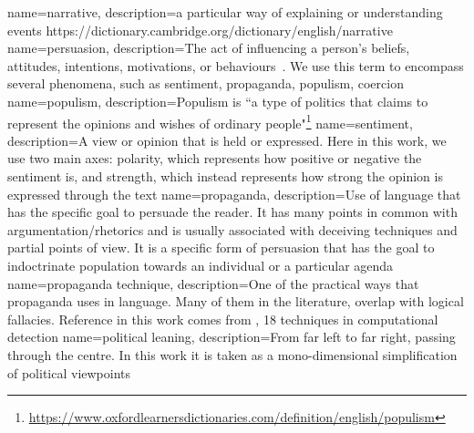 {
    name=narrative,
    description={a particular way of explaining or understanding events
            https://dictionary.cambridge.org/dictionary/english/narrative
        }
}
{
    name=persuasion,
    description={The act of influencing a person's beliefs, attitudes, intentions, motivations, or behaviours~\cite{gass2018persuasion}. We use this term to encompass several phenomena, such as sentiment, \gls{propaganda}, \gls{populism}, coercion}
}
{
    name=populism,
    description={Populism is ``a type of politics that claims to represent the opinions and wishes of ordinary people"\footnote{\url{https://www.oxfordlearnersdictionaries.com/definition/english/populism}}}
}
{
    name=sentiment,
    description={A view or opinion that is held or expressed. Here in this work, we use two main axes: polarity, which represents how positive or negative the sentiment is, and strength, which instead represents how strong the opinion is expressed through the text}
}
{
    name=propaganda,
    description={Use of language that has the specific goal to persuade the reader. It has many points in common with argumentation/rhetorics and is usually associated with deceiving techniques and partial points of view.
            It is a specific form of persuasion
            that has the goal to indoctrinate
            population towards an individual or a particular agenda}
}
{
    name=propaganda technique,
    description={One of the practical ways that propaganda uses in language. Many of them in the literature, overlap with logical fallacies. Reference in this work comes from \cite{TODO}, 18 techniques in computational detection}
}
{
    name=political leaning,
    description={From far left to far right, passing through the centre. In this work it is taken as a mono-dimensional simplification of political viewpoints}
}
